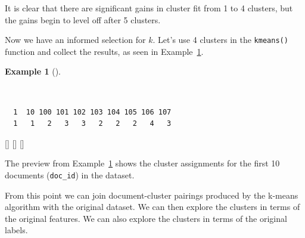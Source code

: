 \documentclass[
  letterpaper,
  krantz1]{latex/krantz-mod}
\newenvironment{Shaded}{\begin{snugshade}}{\end{snugshade}}
\newcommand{\AttributeTok}[1]{\textcolor[rgb]{0.00,0.00,0.00}{#1}}
\newcommand{\CommentTok}[1]{\textcolor[rgb]{0.00,0.00,0.00}{\textit{#1}}}
\newcommand{\DecValTok}[1]{\textcolor[rgb]{0.00,0.00,0.00}{#1}}
\newcommand{\FunctionTok}[1]{\textcolor[rgb]{0.00,0.00,0.00}{#1}}
\newcommand{\NormalTok}[1]{\textcolor[rgb]{0.00,0.00,0.00}{#1}}
\newcommand{\OtherTok}[1]{\textcolor[rgb]{0.00,0.00,0.00}{#1}}
\newcommand{\SpecialCharTok}[1]{\textcolor[rgb]{0.00,0.00,0.00}{#1}}
\newcommand{\cindex}[1]{%
  \StrSubstitute{#1}{_}{\_}[\temp]%
  \index{\temp}%
}
\theoremstyle{definition}
\theoremstyle{definition}
\newtheorem{example}{Example}[chapter]
\theoremstyle{remark}
\begin{document}
It is clear that there are significant gains in cluster fit from 1 to 4
clusters, but the gains begin to level off after 5 clusters.

Now we have an informed selection for \(k\). Let's use 4 clusters in the
\texttt{kmeans()} function and collect the results, as seen in
Example~\ref{exm-explore-masc-pos-kmeans-fit}.

\begin{example}[]\protect\hypertarget{exm-explore-masc-pos-kmeans-fit}{}\label{exm-explore-masc-pos-kmeans-fit}

~

\begin{Shaded}
\end{Shaded}

\begin{verbatim}
  1  10 100 101 102 103 104 105 106 107 
  1   1   2   3   3   2   2   2   4   3 
\end{verbatim}

 \cindex{kmeans()}\cindex{set.seed()}\cindex{\$}

\end{example}

The preview from Example~\ref{exm-explore-masc-pos-kmeans-fit} shows the
cluster assignments for the first 10 documents (\texttt{doc\_id}) in the
dataset.

From this point we can join document-cluster pairings produced by the
k-means algorithm with the original dataset. We can then explore the
clusters in terms of the original features. We can also explore the
clusters in terms of the original
labels.
\end{document}
